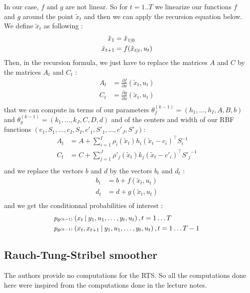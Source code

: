 In our case, $f$ and $g$ are not linear.
So for $t=1..T$ we linearize our functions $f$ and $g$ around the point $\tilde{x}_t$ and then we can apply the recursion equation below.
We define $\tilde{x}_t$ as following :
\begin{align*}
  \tilde{x}_1 &= \hat{x}_{1 \mathbin{\vert} 0}\\
  \tilde{x}_{t+1} &= f(\hat{x}_{t \mathbin{\vert} t}, u_t)\\
\end{align*}
Then, in the recursion formula, we just have to replace the matrices $A$ and $C$  by the matrices $A_t$ and $C_t$ :
\begin{align*}
  A_t &= \frac{\partial f}{\partial x}(\tilde{x}_t, u_t)\\
  C_t &= \frac{\partial g}{\partial x}(\tilde{x}_t, u_t)\\
\end{align*}
that we can compute in terms of our parameters $\theta_f^{(k-1)} = \left( h_1, \ldots , h_I, A, B, b \right)$ and $\theta_g^{(k-1)} = \left( k_1, \ldots , k_J, C, D, d \right)$ and of the centers and width of our RBF functions $(c_1, S_1, \ldots ,c_I, S_I, c'_1, S'_1, \ldots , c'_J, S'_J)$:
\begin{align*}
  A_t &= A + \sum_{i=1}^I \rho_i(\tilde{x}_t) h_i (\tilde{x}_t - c_i)^{\top} S_i^{-1}\\
  C_t &= C + \sum_{j=1}^J \rho'_j(\tilde{x}_t) k_j (\tilde{x}_t - c'_i)^{\top} {S'_j}^{-1}\\
\end{align*}
and we replace the vectors $b$ and $d$ by the vectors $b_t$ and $d_t$ :
\begin{align*}
  b_t &= b + f(\tilde{x}_t, u_t)\\
  d_t &= d + g(\tilde{x}_t, u_t)\\
\end{align*}
and we get the conditionnal probabilities of interest :
\begin{align*}
  &p_{\theta^{(k-1)}}\left(x_t \mathbin{\vert} y_1, u_1, \ldots, y_t, u_t \right), t=1 \ldots T\\
  &p_{\theta^{(k-1)}}\left(x_t, x_{t+1} \mathbin{\vert} y_1, u_1, \ldots, y_t, u_t \right), t=1 \ldots T-1\\
\end{align*}

\subsection{Rauch-Tung-Stribel smoother}
The authors provide no computations for the RTS.
So all the computations done here were inspired from the computations done in the lecture notes.

